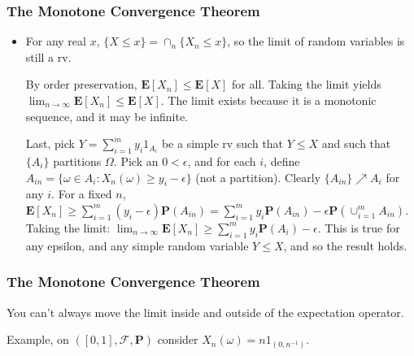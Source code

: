 \documentclass[handout]{beamer}
\newcommand{\BP}{\mathbf{P}}
\newcommand{\BE}{\mathbf{E}}
\begin{document}
\frame
{
  \frametitle{The Monotone Convergence Theorem}

\begin{itemize}

\item<1->[]
\begin{Proof} 
For any real $x$, $\{X \le x\} = \cap_n \{X_n \le x\}$, so the limit of random variables is still a rv. 
\newline

By order preservation, $\BE[X_n] \le \BE[X]$ for all. Taking the limit yields $\lim_{n \to \infty} \BE[X_n] \le \BE[X]$. The limit exists because it is a monotonic sequence, and it may be infinite.
\newline

Last, pick $Y = \sum_{i=1}^m y_i 1_{A_i}$ be a simple rv such that $Y \le X$ and such that $\{A_i\}$ partitions $\Omega$. Pick an $0 <\epsilon$, and for each $i$, define $A_{in} = \{\omega \in A_i : X_{n}(\omega) \ge y_i - \epsilon  \}$ (not a partition). Clearly $\{A_{in}\} \nearrow A_i$ for any $i$. For a fixed $n$, $\BE[X_n] \ge  \sum_{i=1}^m (y_i - \epsilon) \BP(A_{in}) = \sum_{i=1}^m y_i \BP(A_{in}) - \epsilon \BP(\cup_{i=1}^m A_{in})$. Taking the limit: $\lim_{n \to \infty} \BE[X_n] \ge \sum_{i=1}^m y_i \BP(A_{i}) - \epsilon$. This is true for any epsilon, and any simple random variable $Y \le X$, and so the result holds.

\end{Proof}

\end{itemize}
}

\frame
{
  \frametitle{The Monotone Convergence Theorem}

You can't always move the limit inside and outside of the expectation operator.
\newline

Example, on $([0,1],\mathcal{F},\BP)$ consider $X_n(\omega) = n 1_{(0,n^{-1})}$.
\newline

}
\end{document}
